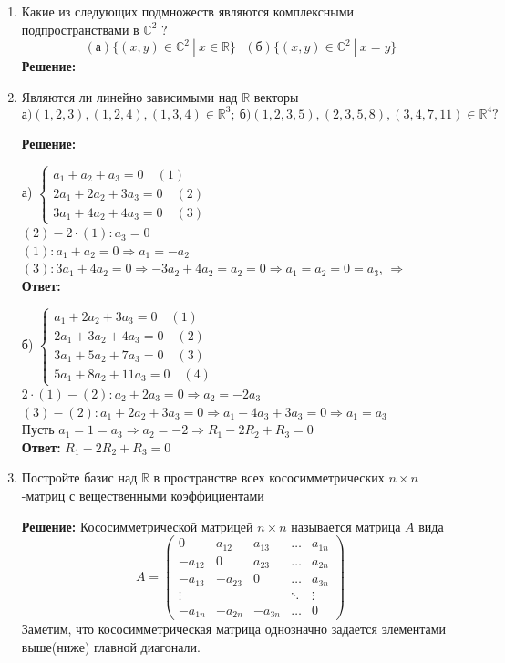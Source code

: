 \documentclass[]{book}
\theoremstyle{definition}
\newcommand{\bb}[1]{\mathbb{#1}}
\begin{document}
\begin{enumerate}[resume]
\item Какие из следующих подмножеств являются комплексными подпространствами в $\mathbb{C}^2$ ?
$$(\text{а})\{(x,y)\in\mathbb{C}^{2}\ |\ x\in\bb{R}\} \ \  \ (\text{б})\{(x,y)\in\mathbb{C}^{2}\ |\ x=y\}$$
\textbf{Решение:}

\item Являются ли линейно зависимыми над $\bb{R}$ векторы
$$ \text{а)}(1,2,3),(1,2,4),(1,3,4) \in\bb{R}^3;\ \text{б)}(1,2,3,5),(2,3,5,8),(3,4,7,11) \in\bb{R}^4?$$

\textbf{Решение:}

а) $
\begin{cases}
   a_1+a_2+a_3=0 \quad (1) \\
   2a_1+2a_2+3a_3=0\quad (2) \\
   3a_1+4a_2+4a_3=0\quad (3)
 \end{cases}
$\\

$(2)-2\cdot(1)\colon a_3 = 0 $\\
$(1): a_1 + a_2 = 0 \Longrightarrow a_1 = -a_2$\\
$(3): 3a_1 + 4a_2 = 0 \Longrightarrow -3a_2+4a_2 = a_2 = 0 \Longrightarrow a_1=a_2=0=a_3$,  $\Longrightarrow$ \\
\textbf{Ответ: } 

б) $
\begin{cases}
   a_1+2a_2+3a_3=0 \quad (1) \\
   2a_1+3a_2+4a_3=0\quad (2) \\
   3a_1+5a_2+7a_3=0\quad (3) \\
   5a_1+8a_2+11a_3=0\quad (4)
 \end{cases}
$\\

$2\cdot (1)-(2)\colon a_2+2a_3 = 0 \Longrightarrow a_2 = -2a_3 $\\
$(3)-(2)\colon a_1+2a_2+3a_3 = 0 \Longrightarrow a_1-4a_3+3a_3 = 0 \Longrightarrow a_1 = a_3$\\
Пусть $a_1 = 1 = a_3 \Longrightarrow a_2= -2 \Longrightarrow R_1 - 2R_2+R_3 = 0$\\
\textbf{Ответ: } $R_1 - 2R_2+R_3 = 0$

\item Постройте базис над $\bb{R}$ в пространстве всех кососимметрических $n\times n$-матриц с вещественными коэффициентами

\textbf{Решение:}
Кососимметрической матрицей $n\times n$ называется матрица $A$ вида
\[
A = 
\begin{pmatrix}
0       & a_{12}  & a_{13}  & \dots  & a_{1n} \\
-a_{12} & 0       & a_{23}  & \dots  & a_{2n} \\
-a_{13} & -a_{23} & 0       & \dots  & a_{3n} \\
\vdots  &         &         & \ddots & \vdots \\
-a_{1n} & -a_{2n} & -a_{3n} & \dots  & 0
\end{pmatrix}
\]
Заметим, что кососимметрическая матрица однозначно задается элементами выше(ниже) главной диагонали.


\end{enumerate}
\end{document}
